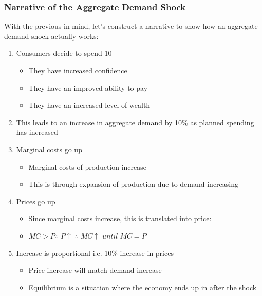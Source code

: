 \documentclass[12pt, letterpaper]{article}
\begin{document}
\subsubsection{Narrative of the Aggregate Demand Shock}
With the previous in mind, let's construct a narrative to show how an aggregate demand shock actually works:
\begin{enumerate}
	\item Consumers decide to spend 10%
		\begin{itemize}
			\item They have increased confidence
			\item They have an improved ability to pay
			\item They have an increased level of wealth
		\end{itemize}
	\item This leads to an increase in aggregate demand by 10\% as planned spending has increased
	\item Marginal costs go up
		\begin{itemize}
			\item Marginal costs of production increase
			\item This is through expansion of production due to demand increasing
		\end{itemize}
	\item Prices go up
		\begin{itemize}
			\item Since marginal costs increase, this is translated into price:
			\item $MC > P \therefore\; P\uparrow\; \therefore\; MC\uparrow\; until\;MC = P$ 
		\end{itemize}
	\item Increase is proportional i.e. 10\% increase in prices
		\begin{itemize}
			\item Price increase will match demand increase
			\item Equilibrium is a situation where the economy ends up in after the shock
		\end{itemize}
\end{enumerate}
\end{document}
